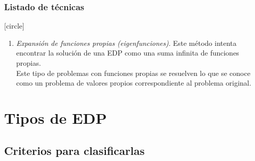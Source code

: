 \documentclass[12pt]{beamer}
\begin{document}
\begin{frame}
\frametitle{Listado de técnicas}
[circle]
\begin{enumerate}[<+->]
\conti    
\item \emph{Expansión de funciones propias (eigenfunciones)}. Este método intenta encontrar la solución de una EDP como una suma infinita de funciones propias.
\\
\bigskip
\pause    
Este tipo de problemas con funciones propias se resuelven lo que se conoce como un problema de valores propios correspondiente al problema original.
\end{enumerate}
\end{frame}

\section{Tipos de EDP}
\subsection{Criterios para clasificarlas}
\end{document}
